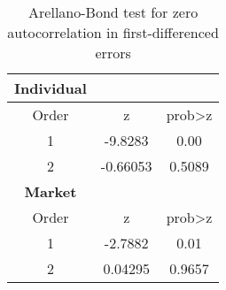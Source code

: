 \begin{table}[]
\centering
\begin{tabular}{@{}ccc@{}}
\toprule
\multicolumn{1}{l}{\textbf{Individual}} & \multicolumn{1}{l}{} & \multicolumn{1}{l}{} \\ \midrule
Order                                   & z                    & prob\textgreater{}z  \\
1                                       & -9.8283              & 0.00                 \\
2                                       & -0.66053             & 0.5089               \\ \midrule
\textbf{Market}                         &                      &                      \\ \midrule
Order                                   & z                    & prob\textgreater{}z  \\
1                                       & -2.7882              & 0.01                 \\
2                                       & 0.04295              & 0.9657               \\ \bottomrule
\end{tabular}
\caption{Arellano-Bond test for zero autocorrelation in first-differenced errors
}
\label{autocorrelation_test}
\end{table}